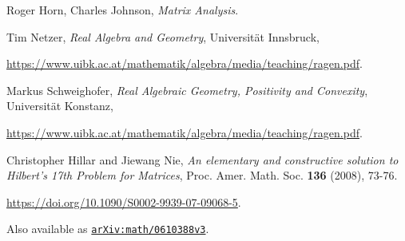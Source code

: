 \documentclass{article}
\newcommand\arxiv[1]{\href{http://www.arxiv.org/abs/#1}{\texttt{arXiv:#1}}}
\begin{document}
\begin{thebibliography}{999999}
    \raggedright\footnotesize

    Roger Horn, Charles Johnson, 
    \textit{Matrix Analysis}.

    Tim Netzer, 
    \textit{Real Algebra and Geometry}, 
    Universit\"at Innsbruck, 

    \url{https://www.uibk.ac.at/mathematik/algebra/media/teaching/ragen.pdf}.

    Markus Schweighofer, 
    \textit{Real Algebraic Geometry, Positivity and Convexity}, 
    Universit\"at Konstanz, 

    \url{https://www.uibk.ac.at/mathematik/algebra/media/teaching/ragen.pdf}.

    Christopher Hillar and Jiewang Nie,
    \textit{An elementary and constructive solution to Hilbert's 17th Problem for Matrices},
    Proc. Amer. Math. Soc. \textbf{136} (2008), 73-76.

    \url{https://doi.org/10.1090/S0002-9939-07-09068-5}. 

    Also available as \arxiv{math/0610388v3}.
\end{thebibliography}
\end{document}
